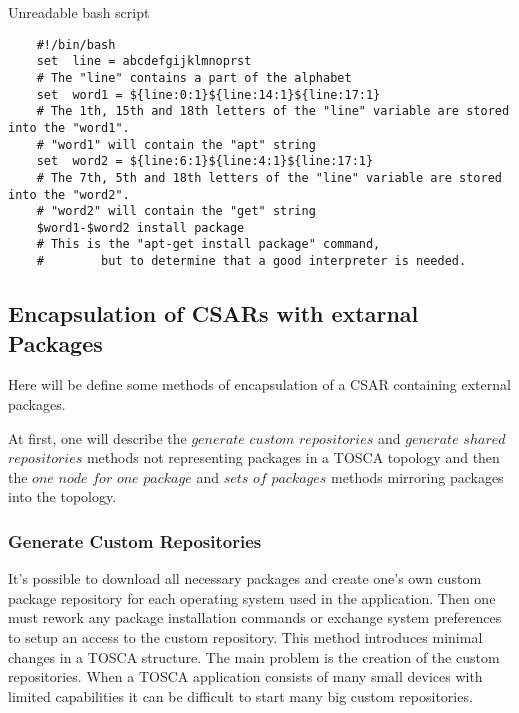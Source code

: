 \begin{Listing} 
	\caption{Unreadable bash script}
	\label{alg:unreadable}
	\begin{lstlisting}
	#!/bin/bash
	set  line = abcdefgijklmnoprst
	# The "line" contains a part of the alphabet
	set  word1 = ${line:0:1}${line:14:1}${line:17:1} 
	# The 1th, 15th and 18th letters of the "line" variable are stored into the "word1".
	# "word1" will contain the "apt" string 
	set  word2 = ${line:6:1}${line:4:1}${line:17:1}
	# The 7th, 5th and 18th letters of the "line" variable are stored into the "word2".
	# "word2" will contain the "get" string 
	$word1-$word2 install package
	# This is the "apt-get install package" command,
	#		 but to determine that a good interpreter is needed.
	\end{lstlisting}
\end{Listing}

\subsection*{Encapsulation of CSARs with extarnal Packages}\label{subs:encaps}
Here will be define some methods of encapsulation of a CSAR containing external packages.

At first, one will describe the $generate$ $custom$ $repositories$ and $generate$ $shared$ $repositories$ methods not representing packages in a TOSCA topology and then the $one$ $node$ $for$ $one$ $package$ and $sets$ $of$ $packages$ methods mirroring packages into the topology.
\subsubsection*{Generate Custom Repositories}
It's possible to download all necessary packages and create one's own custom package repository for each operating system used in the application. 
Then one must rework any package installation commands or exchange system preferences to setup an access to the custom repository.
This method introduces minimal changes in a TOSCA structure.
The main problem is the creation of the custom repositories. 
When a TOSCA application consists of many small devices with limited capabilities it can be difficult to start many big custom repositories.
